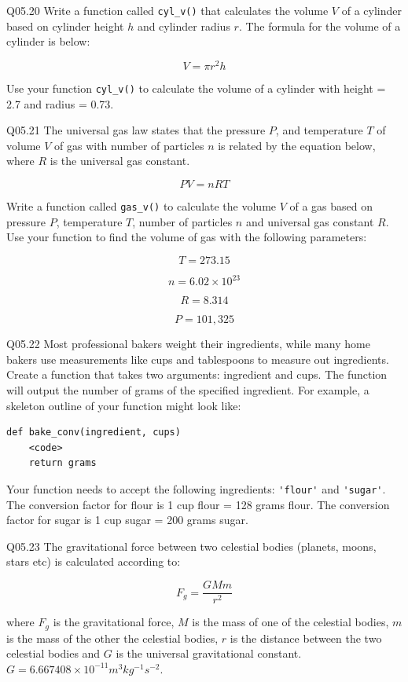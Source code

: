 \documentclass{book}
\begin{document}
Q05.20 Write a function called \lstinline!cyl_v()! that calculates the
volume \(V\) of a cylinder based on cylinder height \(h\) and cylinder
radius \(r\). The formula for the volume of a cylinder is below:

\[ V = \pi r^2 h \]

Use your function \lstinline!cyl_v()! to calculate the volume of a
cylinder with height = 2.7 and radius = 0.73.

Q05.21 The universal gas law states that the pressure \(P\), and
temperature \(T\) of volume \(V\) of gas with number of particles \(n\)
is related by the equation below, where \(R\) is the universal gas
constant.

\[ PV = nRT \]

Write a function called \lstinline!gas_v()! to calculate the volume
\(V\) of a gas based on pressure \(P\), temperature \(T\), number of
particles \(n\) and universal gas constant \(R\). Use your function to
find the volume of gas with the following parameters:

\[ T = 273.15\]

\[ n = 6.02 \times 10^{23} \]

\[ R = 8.314 \]

\[ P = 101,325 \]

Q05.22 Most professional bakers weight their ingredients, while many
home bakers use measurements like cups and tablespoons to measure out
ingredients. Create a function that takes two arguments: ingredient and
cups. The function will output the number of grams of the specified
ingredient. For example, a skeleton outline of your function might look
like:

\begin{lstlisting}
def bake_conv(ingredient, cups)
    <code>
    return grams
\end{lstlisting}

Your function needs to accept the following ingredients:
\lstinline!'flour'! and \lstinline!'sugar'!. The conversion factor for
flour is 1 cup flour = 128 grams flour. The conversion factor for sugar
is 1 cup sugar = 200 grams sugar.

Q05.23 The gravitational force between two celestial bodies (planets,
moons, stars etc) is calculated according to:

\[ F_g = \frac{GMm}{r^2} \]

where \(F_g\) is the gravitational force, \(M\) is the mass of one of
the celestial bodies, \(m\) is the mass of the other the celestial
bodies, \(r\) is the distance between the two celestial bodies and \(G\)
is the universal gravitational constant.
\(G=6.667408 \times 10^{-11} m^3 kg^{-1}s^{-2}\).
\end{document}
